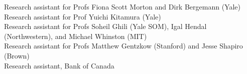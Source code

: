 \documentclass[11pt]{article} %
\begin{document}
 Research assistant for Profs Fiona Scott Morton and 
	Dirk Bergemann (Yale) \\

 Research assistant for Prof Yuichi Kitamura (Yale) \\
 Research assistant for Profs Soheil Ghili (Yale SOM), Igal Hendal (Northwestern), and Michael Whinston (MIT) \\
  Research assistant for Profs Matthew Gentzkow (Stanford) and Jesse Shapiro (Brown) \\
 Research assistant, Bank of Canada \\

%
%



\vfill %
\end{document}
